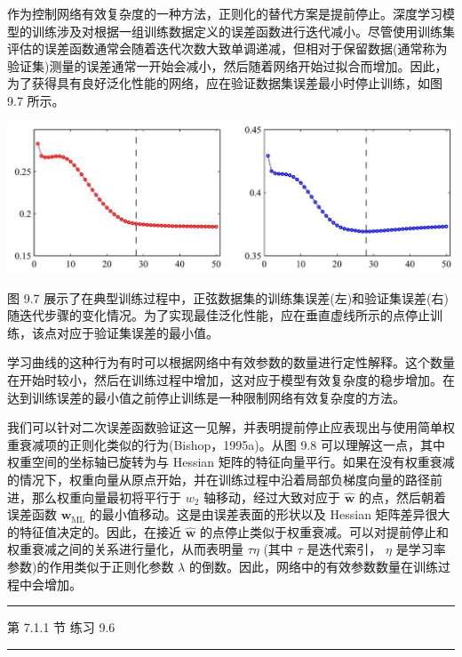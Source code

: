 \documentclass[10pt]{article}
\newcommand{\HRule}{\begin{center}\rule{0.9\linewidth}{0.2mm}\end{center}}
\begin{document}
作为控制网络有效复杂度的一种方法，正则化的替代方案是提前停止。深度学习模型的训练涉及对根据一组训练数据定义的误差函数进行迭代减小。尽管使用训练集评估的误差函数通常会随着迭代次数大致单调递减，但相对于保留数据(通常称为验证集)测量的误差通常一开始会减小，然后随着网络开始过拟合而增加。因此，为了获得具有良好泛化性能的网络，应在验证数据集误差最小时停止训练，如图 9.7 所示。

\begin{center}
\includegraphics[max width=1.0\textwidth]{images/0194e279-9b28-703a-88f4-c3ac21e2010d_286_229_366_1299_437_0.jpg}
\end{center}
\hspace*{3em} 

图 9.7 展示了在典型训练过程中，正弦数据集的训练集误差(左)和验证集误差(右)随迭代步骤的变化情况。为了实现最佳泛化性能，应在垂直虚线所示的点停止训练，该点对应于验证集误差的最小值。

学习曲线的这种行为有时可以根据网络中有效参数的数量进行定性解释。这个数量在开始时较小，然后在训练过程中增加，这对应于模型有效复杂度的稳步增加。在达到训练误差的最小值之前停止训练是一种限制网络有效复杂度的方法。

我们可以针对二次误差函数验证这一见解，并表明提前停止应表现出与使用简单权重衰减项的正则化类似的行为(Bishop，1995a)。从图 9.8 可以理解这一点，其中权重空间的坐标轴已旋转为与 Hessian 矩阵的特征向量平行。如果在没有权重衰减的情况下，权重向量从原点开始，并在训练过程中沿着局部负梯度向量的路径前进，那么权重向量最初将平行于 \({w}_{2}\) 轴移动，经过大致对应于 \(\widehat{\mathbf{w}}\) 的点，然后朝着误差函数 \({\mathbf{w}}_{\mathrm{{ML}}}\) 的最小值移动。这是由误差表面的形状以及 Hessian 矩阵差异很大的特征值决定的。因此，在接近 \(\widehat{\mathbf{w}}\) 的点停止类似于权重衰减。可以对提前停止和权重衰减之间的关系进行量化，从而表明量 \({\tau \eta }\) (其中 \(\tau\) 是迭代索引， \(\eta\) 是学习率参数)的作用类似于正则化参数 \(\lambda\) 的倒数。因此，网络中的有效参数数量在训练过程中会增加。

\HRule

第 7.1.1 节 练习 9.6

\HRule
\end{document}
